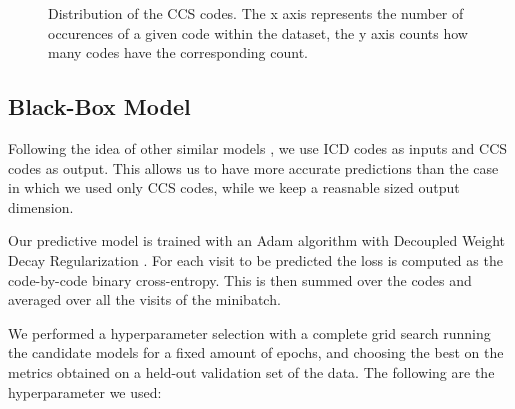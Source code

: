 \documentclass[]{marticle}
\begin{document}
\begin{figure}[!tb] 
\caption{
    Distribution of the CCS codes. The x axis represents the number of occurences of a given code
    within the dataset, the y axis counts how many codes have the corresponding count.
} 
\label{fig:ccs-dist} 
\end{figure}


\subsection{Black-Box Model}

Following the idea of other similar models \cite{setor-paper}, we use ICD codes as inputs and CCS
codes as output. This allows us to have more accurate predictions than the case in which we used
only CCS codes, while we keep a reasnable sized output dimension.

Our predictive model is trained with an Adam algorithm with Decoupled Weight Decay Regularization
\cite{paper-adamw}. For each visit to be predicted the loss is computed as the code-by-code binary
cross-entropy. This is then summed over the codes and averaged over all the visits of the minibatch.

We performed a hyperparameter selection with a complete grid search running the candidate models for
a fixed amount of epochs, and choosing the best on the metrics obtained on a held-out validation set
of the data. The following are the hyperparameter we used:
\end{document}
